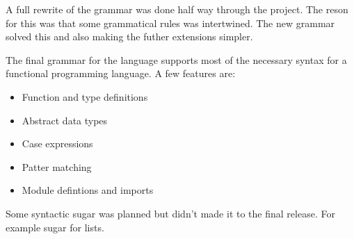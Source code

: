 A full rewrite of the grammar was done half way through the project. The reson for this was that some grammatical rules was intertwined. The new grammar solved this and also making the futher extensions simpler. 

The final grammar for the language supports most of the necessary syntax for a functional programming language. A few features are:

\begin{itemize}
  \item Function and type definitions
  \item Abstract data types
  \item Case expressions
  \item Patter matching
  \item Module defintions and imports
\end{itemize}

Some syntactic sugar was planned but didn't made it to the final release. For example sugar for lists.%





